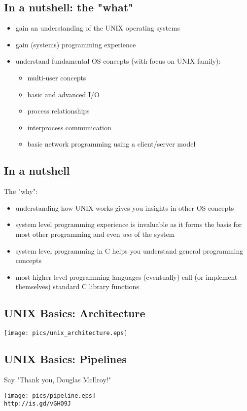 \documentclass[xga]{xdvislides}
\begin{document}
\subsection{In a nutshell: the "what"}
\begin{itemize}
	\item gain an understanding of the UNIX operating systems
	\item gain (systems) programming experience
	\item understand fundamental OS concepts (with focus on UNIX family):
		\begin{itemize}
			\item multi-user concepts
			\item basic and advanced I/O
			\item process relationships
			\item interprocess communication
			\item basic network programming using a client/server model
		\end{itemize}
\end{itemize}

\subsection{In a nutshell}
The "why":
\begin{itemize}
	\item understanding how UNIX works gives you insights in other OS concepts
	\item system level programming experience is invaluable as it
		forms the basis for most other programming and even {\em
		use} of the system
	\item system level programming in C helps you understand general
		programming concepts
	\item most higher level programming languages (eventually) call
		(or implement themselves) standard C library functions
\end{itemize}


\subsection{UNIX Basics: Architecture}
\begin{center}
\texttt{[image: pics/unix\_architecture.eps]}
\end{center}

\subsection{UNIX Basics: Pipelines}
Say "Thank you, Douglas McIlroy!"
\begin{center}
\texttt{[image: pics/pipeline.eps]} \\
\verb+http://is.gd/vGHO9J+ \\
\end{center}
\end{document}
